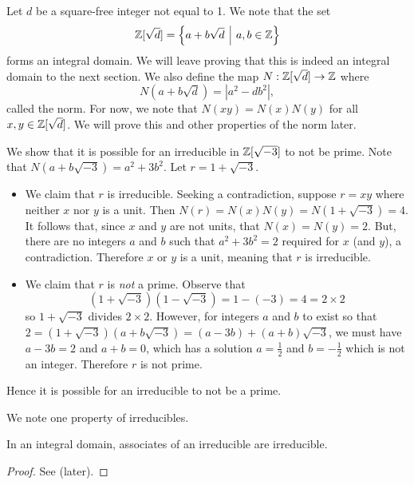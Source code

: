 Let $d$ be a square-free integer not equal to 1. We note that the set 
\[
    \Z[\sqrt{d}] = \left\{a + b\sqrt{d} \vert a,b \in \Z\right\}
\]
forms an integral domain. We will leave proving that this is indeed an integral domain to the next section. We also define the map $N: \mathbb{Z}[\sqrt{d}] \to \mathbb{Z}$ where
\[
    N(a+b\sqrt{d}) = |a^2 - db^2|,
\]
called the norm. For now, we note that $N(xy) = N(x)N(y)$ for all $x, y \in \mathbb{Z}[\sqrt{d}]$. We will prove this and other properties of the norm later.

\begin{example}
    We show that it is possible for an irreducible in $\mathbb{Z}[\sqrt{-3}]$ to not be prime. Note that $N(a+b\sqrt{-3}) = a^2 + 3b^2$. Let $r = 1 + \sqrt{-3}$.
    \begin{itemize}
        \item We claim that $r$ is irreducible. Seeking a contradiction, suppose $r = xy$ where neither $x$ nor $y$ is a unit. Then $N(r) = N(x)N(y) = N(1+\sqrt{-3}) = 4$. It follows that, since $x$ and $y$ are not units, that $N(x) = N(y) = 2$. But, there are no integers $a$ and $b$ such that $a^2 + 3b^2 = 2$ required for $x$ (and $y$), a contradiction. Therefore $x$ or $y$ is a unit, meaning that $r$ is irreducible.

        \item We claim that $r$ is \textit{not} a prime. Observe that
        \[
            (1+\sqrt{-3})(1-\sqrt{-3}) = 1-(-3) = 4 = 2 \times 2
        \]
        so $1 + \sqrt{-3}$ divides $2 \times 2$. However, for integers $a$ and $b$ to exist so that $2 = (1+\sqrt{-3})(a+b\sqrt{-3}) = (a-3b) + (a+b)\sqrt{-3}$, we must have $a - 3b = 2$ and $a + b = 0$, which has a solution $a = \frac12$ and $b = -\frac12$ which is not an integer. Therefore $r$ is not prime.
    \end{itemize}
    Hence it is possible for an irreducible to not be a prime.
\end{example}

We note one property of irreducibles.
\begin{proposition}\label{prop-associates-of-irreducible-is-irreducible}
    In an integral domain, associates of an irreducible are irreducible.
\end{proposition}
\begin{proof}
    See  (later).
\end{proof}

